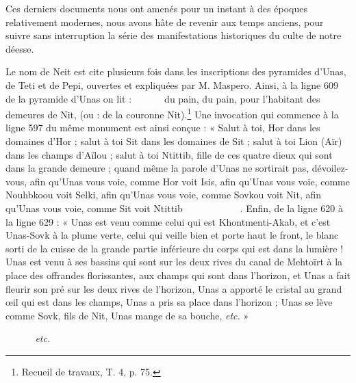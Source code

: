 \documentclass[letterpaper,twocolumn,openany,nodeprecatedcode]{dndbook}
\newcommand*\hieroAAAG{}
\newcommand*\hieroAAAH{}
\newcommand*\hieroAAAI{}
\newcommand*\hieroAAAO{}
\newcommand*\hieroAAAQ{}
\newcommand*\hieroAABR{}
\newcommand*\hieroAABS{}
\newcommand*\hieroAACD{}
\newcommand*\hieroAACO{}
\newcommand*\hieroAACS{}
\newcommand*\hieroAADL{}
\newcommand*\hieroAAEP{\raisebox{0.5ex}{}}
\newcommand*\hieroAAES{\raisebox{0.5ex}{}}
\newcommand*\hieroAAFD{}
\newcommand*\hieroAAHA{}
\newcommand*\hieroAAIS{}
\newcommand*\hieroAAQC{}
\newcommand*\hieroAATP{}
\newcommand*\hieroAATQ{}
\newcommand*\hieroAATR{}
\newcommand*\hieroAATS{}
\newcommand*\hieroAATT{}
\newcommand*\hieroAATU{}
\newcommand*\hieroAATV{\raisebox{0.3ex}{}}
\newcommand*\hieroAATW{}
\newcommand*\hieroAATX{}
\newcommand*\hieroAATY{}
\newcommand*\hieroAATZ{}
\begin{document}
Ces derniers documents nous ont amenés pour un instant à des époques relativement modernes, nous avons hâte de revenir aux temps anciens, pour suivre sans interruption la série des manifestations historiques du culte de notre déesse.

Le nom de Neit est cite plusieurs fois dans les inscriptions des pyramides d'Unas, de Teti et de Pepi, ouvertes et expliquées par M. Maspero. Ainsi, à la ligne 609 de la pyramide d'Unas on lit : $\hieroAADL\:\hieroAAAG\:\hieroAATP\allowbreak\:\hieroAADL\:\hieroAAAG\:\hieroAAAG\allowbreak\:\hieroAATP\:\hieroAAEP\:\hieroAAHA\allowbreak\:\hieroAACD\:\hieroAAHA\allowbreak\:\hieroAAAQ\:\hieroAAQC$ du pain, du pain, pour l'habitant des demeures de Nit, (ou : de la couronne Nit).\footnote{Recueil de travaux, T. 4, p. 75.} Une invocation qui commence à la ligne 597 du même monument est ainsi conçue : « Salut à toi, Hor dans les domaines d'Hor ; salut à toi Sit dans les domaines de Sit ; salut à toi Lion (Aïr) dans les champs d'Aïlou ; salut à toi Ntittib, fille de ces quatre dieux qui sont dans la grande demeure ; quand même la parole d'Unas ne sortirait pas, dévoilez-vous, afin qu'Unas vous voie, comme Hor voit Isis, afin qu'Unas vous voie, comme Nouhbkoou voit Selki, afin qu'Unas vous voie, comme Sovkou voit Nit, afin qu'Unas vous voie, comme Sit voit Ntittib $\hieroAATQ\:\hieroAAAG\:\hieroAATR\allowbreak\:\hieroAABS\:\hieroAACO\:\hieroAAIS\:\hieroAATQ\:\hieroAAAG\:\hieroAAAG\allowbreak\:\hieroAATS\:\hieroAAAO\:\hieroAATQ\:\hieroAAAG\:\hieroAATR\:\hieroAABS\allowbreak\:\hieroAACO\:\hieroAAIS\:\hieroAAEP\:\hieroAATQ\:\hieroAAAG\:\hieroAAAG\allowbreak\:\hieroAATT\:\hieroAATU\:\hieroAACD\allowbreak\:\hieroAAAH\:\hieroAATV$. Enfin, de la ligne 620 à la ligne 629 : « Unas est venu comme celui qui est Khontmenti-Akab, et c'est Unas-Sovk à la plume verte, celui qui veille bien et porte haut le front, le blanc sorti de la cuisse de la grande partie inférieure du corps qui est dans la lumière ! Unas est venu à ses bassins qui sont sur les deux rives du canal de Mehtoïrt à la place des offrandes florissantes, aux champs qui sont dans l'horizon, et Unas a fait fleurir son pré sur les deux rives de l'horizon, Unas a apporté le cristal au grand œil qui est dans les champs, Unas a pris sa place dans l'horizon ; Unas se lève comme Sovk, fils de Nit, Unas mange de sa bouche, \emph{etc.} »

$\hieroAATW\:\hieroAACO\:\hieroAABR\allowbreak\:\hieroAACS\:\hieroAAFD\:\hieroAAES\allowbreak\:\hieroAAAI\:\hieroAAAQ\:\hieroAATX\allowbreak\:\hieroAATY\:\hieroAACO\allowbreak\:\hieroAABR\:\hieroAATZ$ \emph{etc.}
\end{document}
